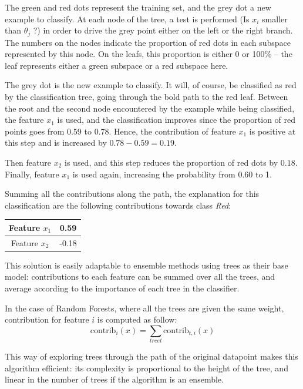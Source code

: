 \documentclass[a4paper,11pt]{kth-mag}
\begin{document}
The green and red dots represent the training set, and the grey dot a new example to classify. At each node of the tree, a test is performed (Is $x_i$ smaller than $\theta_j$ ?) in order to drive the grey point either on the left or the right branch. The numbers on the nodes indicate the proportion of red dots in each subspace represented by this node. On the leafs, this proportion is either 0 or 100\% -- the leaf represents either a green subspace or a red subspace here.

The grey dot is the new example to classify. It will, of course, be classified as red by the classification tree, going through the bold path to the red leaf. 
Between the root and the second node encountered by the example while being classified, the feature $x_1$ is used, and the classification improves since the proportion of red points goes from 0.59 to 0.78. Hence, the contribution of feature $x_1$ is positive at this step and is increased by $0.78 - 0.59 = 0.19$.

Then feature $x_2$ is used, and this step reduces the proportion of red dots by $0.18$. Finally, feature $x_1$ is used again, increasing the probability from 0.60 to 1. 

Summing all the contributions along the path, the explanation for this classification are the following contributions towards class \textit{Red}:

\begin{center}
\begin{tabular}{|c|c|}
\hline
Feature $x_1$ & 0.59 \\
\hline
Feature $x_2$ & -0.18 \\
\hline
\end{tabular}
\end{center}

This solution is easily adaptable to ensemble methods using trees as their base model: contributions to each feature can be summed over all the trees, and average according to the importance of each tree in the classifier.

In the case of Random Forests, where all the trees are given the same weight, contribution for feature $i$ is computed as follow:
\[
	\mathrm{contrib}_i(x) = \sum_{tree t} \mathrm{contrib}_{t,i} (x)
\]

This way of exploring trees through the path of the original datapoint makes this algorithm efficient: its complexity is proportional to the height of the tree, and linear in the number of trees if the algorithm is an ensemble.
\end{document}
